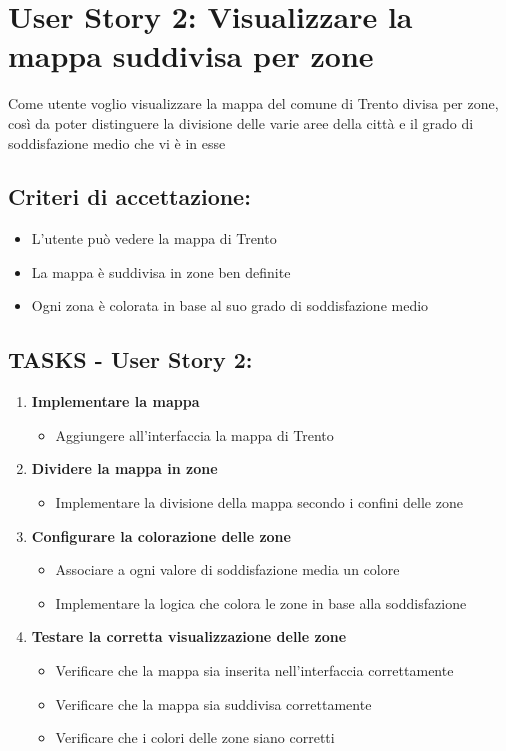 \section*{User Story 2: Visualizzare la mappa suddivisa per zone}  
Come utente voglio visualizzare la mappa del comune di Trento divisa per zone, così da poter distinguere la divisione delle varie aree della città e il grado di soddisfazione medio che vi è in esse  
\subsection*{Criteri di accettazione:}  
\begin{itemize}  
    \item L'utente può vedere la mappa di Trento
    \item La mappa è suddivisa in zone ben definite  
    \item Ogni zona è colorata in base al suo grado di soddisfazione medio
\end{itemize}  
\subsection*{TASKS - User Story 2:}  
\begin{enumerate}  
    \item \textbf{Implementare la mappa}  
        \begin{itemize}  
            \item Aggiungere all'interfaccia la mappa di Trento
        \end{itemize}  
    \item \textbf{Dividere la mappa in zone}  
        \begin{itemize}  
            \item Implementare la divisione della mappa secondo i confini delle zone
        \end{itemize}  
    \item \textbf{Configurare la colorazione delle zone}  
        \begin{itemize}  
            \item Associare a ogni valore di soddisfazione media un colore  
            \item Implementare la logica che colora le zone in base alla soddisfazione
        \end{itemize}  
    \item \textbf{Testare la corretta visualizzazione delle zone}  
        \begin{itemize}  
            \item Verificare che la mappa sia inserita nell'interfaccia correttamente
            \item Verificare che la mappa sia suddivisa correttamente  
            \item Verificare che i colori delle zone siano corretti 
        \end{itemize}  
\end{enumerate}  
